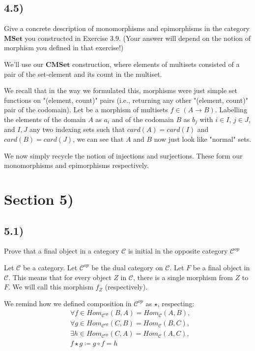 \documentclass[12pt, letterpaper, twoside]{report}
\begin{document}
\subsection*{4.5)}

Give a concrete description of monomorphisms and epimorphisms in the category $\mathbf{MSet}$ you constructed in Exercise 3.9. (Your answer will depend on the notion of morphism you defined in that exercise!)

We'll use our $\mathbf{CMSet}$ construction, where elements of multisets consisted of a pair of the set-element and its count in the multiset. 

We recall that in the way we formulated this, morphisms were just simple set functions on "(element, count)" pairs (i.e., returning any other "(element, count)" pair of the codomain). Let be a morphism of multisets $f \in (A \to B)$. Labelling the elements of the domain $A$ as $a_i$ and of the codomain $B$ as $b_j$ with $i \in I$, $j \in J$, and $I, J$ any two indexing sets such that $card(A) = card(I)$ and $card(B) = card(J)$, we can see that $A$ and $B$ now just look like "normal" sets.

We now simply recycle the notion of injections and surjections. These form our monomorphisms and epimorphisms respectively.


\section*{Section 5)}

\subsection*{5.1)}

Prove that a final object in a category $\mathcal{C}$ is initial in the opposite category $\mathcal{C}^{op}$

Let $\mathcal{C}$ be a category. Let $\mathcal{C}^{op}$ be the dual category on $\mathcal{C}$. Let $F$ be a final object in $\mathcal{C}$. This means that for every object $Z$ in $\mathcal{C}$, there is a single morphism from $Z$ to $F$. We will call this morphism $f_Z$ (respectively).

We remind how we defined composition in $\mathcal{C}^{op}$ as $\star$, respecting:
$$
\begin{aligned}
	& \forall f \in Hom_{\mathcal{C}^{op}} (B, A) = Hom_{\mathcal{C}} (A, B), \\
	& \forall g \in Hom_{\mathcal{C}^{op}} (C, B) = Hom_{\mathcal{C}} (B, C), \\
	& \exists h \in Hom_{\mathcal{C}^{op}} (C, A) = Hom_{\mathcal{C}} (A, C), \\
	& f \star g \coloneqq g \circ f = h
\end{aligned}
$$
\end{document}
